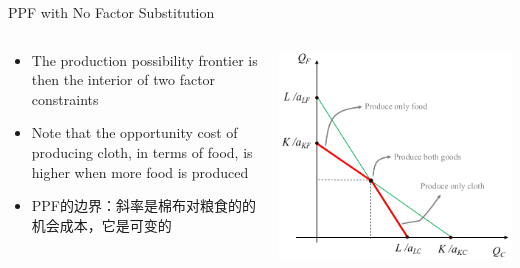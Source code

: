 \documentclass[10pt,hyperref={CJKbookmarks=true},xcolor=dvipsnames,aspectratio=169]{beamer}
\begin{document}
\begin{frame}{PPF with No Factor Substitution }


\begin{columns}[onlytextwidth]
\begin{column}{0.5\textwidth}
\begin{itemize}
\item The production possibility frontier is then the interior of two factor
constraints 
\item Note that the opportunity cost of producing cloth, in terms of food,
is higher when more food is produced
\item PPF的边界：斜率是棉布对粮食的的机会成本，它是可变的
\end{itemize}

\end{column}
\begin{column}{0.5\textwidth}
\includegraphics[width=\columnwidth]{fig/ho/lec5-6}
\end{column}
\end{columns}

\end{frame}
\end{document}
